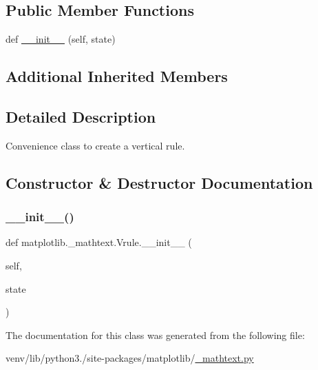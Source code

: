 \subsection*{Public Member Functions}
\begin{DoxyCompactItemize}
\item 
def \hyperlink{classmatplotlib_1_1__mathtext_1_1Vrule_afd668255aa1d3b63f807e430163fa951}{\+\_\+\+\_\+init\+\_\+\+\_\+} (self, state)
\end{DoxyCompactItemize}
\subsection*{Additional Inherited Members}


\subsection{Detailed Description}
\begin{DoxyVerb}Convenience class to create a vertical rule.\end{DoxyVerb}
 

\subsection{Constructor \& Destructor Documentation}
\mbox{\label{classmatplotlib_1_1__mathtext_1_1Vrule_afd668255aa1d3b63f807e430163fa951}} 
\subsubsection{\texorpdfstring{\+\_\+\+\_\+init\+\_\+\+\_\+()}{\_\_init\_\_()}}
{\footnotesize\ttfamily def matplotlib.\+\_\+mathtext.\+Vrule.\+\_\+\+\_\+init\+\_\+\+\_\+ (\begin{DoxyParamCaption}\item[{}]{self,  }\item[{}]{state }\end{DoxyParamCaption})}



The documentation for this class was generated from the following file\+:\begin{DoxyCompactItemize}
\item 
venv/lib/python3./site-\/packages/matplotlib/\hyperlink{__mathtext_8py}{\+\_\+mathtext.\+py}\end{DoxyCompactItemize}
